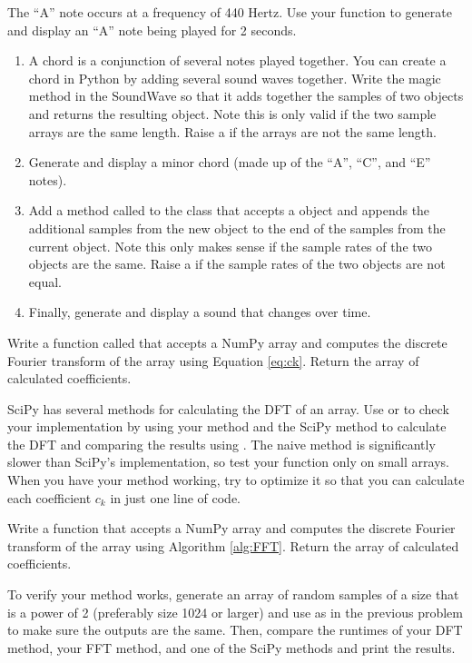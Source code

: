 The ``A'' note occurs at a frequency of 440 Hertz.
Use your function to generate and display an ``A'' note being played for 2 seconds.
\label{prob:generate_note}

\leavevmode
\begin{enumerate}
\item A chord is a conjunction of several notes played together.
You can create a chord in Python by adding several sound waves together.
Write the  magic method in the SoundWave so that it adds together the samples of two  objects and returns the resulting  object.
Note this is only valid if the two sample arrays are the same length.
Raise a  if the arrays are not the same length.
\item Generate and display a minor chord (made up of the ``A'', ``C'', and ``E'' notes).
\item Add a method called  to the  class that accepts a  object and appends the additional samples from the new object to the end of the samples from the current object.
Note this only makes sense if the sample rates of the two objects are the same.
Raise a  if the sample rates of the two objects are not equal.
\item Finally, generate and display a sound that changes over time.

\end{enumerate}
 
Write a function called  that accepts a NumPy array and computes the discrete Fourier transform of the array using Equation \ref{eq:ck}.
Return the array of calculated coefficients.

SciPy has several methods for calculating the DFT of an array.
Use  or  to check your implementation by using your method and the SciPy method to calculate the DFT and comparing the results using .
The naive method is significantly slower than SciPy's implementation, so test your function only on small arrays.
When you have your method working, try to optimize it so that you can calculate each coefficient $c_k$ in just one line of code.
\label{prob:dft}

Write a function that accepts a NumPy array and computes the discrete Fourier transform of the array using Algorithm \ref{alg:FFT}. 
Return the array of calculated coefficients.

To verify your method works, generate an array of random samples of a size that is a power of 2 (preferably size 1024 or larger) and use  as in the previous problem to make sure the outputs are the same.
Then, compare the runtimes of your DFT method, your FFT method, and one of the SciPy methods and print the results.

